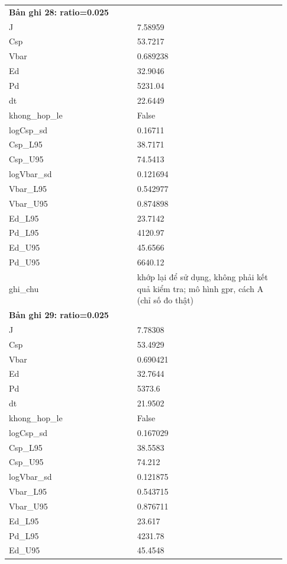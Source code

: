 \begin{longtable}{p{0.43\linewidth}p{0.50\linewidth}}
\midrule
\multicolumn{2}{p{0.95\linewidth}}{\textbf{Bản ghi 28: ratio=0.025}} \\
J & 7.58959 \\
Csp & 53.7217 \\
Vbar & 0.689238 \\
Ed & 32.9046 \\
Pd & 5231.04 \\
dt & 22.6449 \\
khong\_\allowbreak hop\_\allowbreak le & False \\
logCsp\_\allowbreak sd & 0.16711 \\
Csp\_\allowbreak L95 & 38.7171 \\
Csp\_\allowbreak U95 & 74.5413 \\
logVbar\_\allowbreak sd & 0.121694 \\
Vbar\_\allowbreak L95 & 0.542977 \\
Vbar\_\allowbreak U95 & 0.874898 \\
Ed\_\allowbreak L95 & 23.7142 \\
Pd\_\allowbreak L95 & 4120.97 \\
Ed\_\allowbreak U95 & 45.6566 \\
Pd\_\allowbreak U95 & 6640.12 \\
ghi\_\allowbreak chu & khớp lại để sử dụng, không phải kết quả kiểm tra; mô hình gpr, cách A (chỉ số đo thật) \\
\midrule
\multicolumn{2}{p{0.95\linewidth}}{\textbf{Bản ghi 29: ratio=0.025}} \\
J & 7.78308 \\
Csp & 53.4929 \\
Vbar & 0.690421 \\
Ed & 32.7644 \\
Pd & 5373.6 \\
dt & 21.9502 \\
khong\_\allowbreak hop\_\allowbreak le & False \\
logCsp\_\allowbreak sd & 0.167029 \\
Csp\_\allowbreak L95 & 38.5583 \\
Csp\_\allowbreak U95 & 74.212 \\
logVbar\_\allowbreak sd & 0.121875 \\
Vbar\_\allowbreak L95 & 0.543715 \\
Vbar\_\allowbreak U95 & 0.876711 \\
Ed\_\allowbreak L95 & 23.617 \\
Pd\_\allowbreak L95 & 4231.78 \\
Ed\_\allowbreak U95 & 45.4548 \\

\end{longtable}
